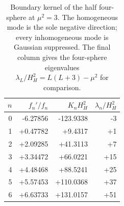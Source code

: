 \begin{table}[htbp]\centering\small
\begin{tabular}{r r r r}
\hline
$n$ & $f_n'/f_n$ & $K_n H_H^2$ & $\lambda_n/H_H^2$ \\
\hline
0 & -6.27856 & -123.9338 & -3 \\
1 & +0.47782 & +9.4317 & +1 \\
2 & +2.09285 & +41.3113 & +7 \\
3 & +3.34472 & +66.0221 & +15 \\
4 & +4.48468 & +88.5241 & +25 \\
5 & +5.57453 & +110.0368 & +37 \\
6 & +6.63733 & +131.0157 & +51 \\
\hline
\end{tabular}
\caption{Boundary kernel of the half four-sphere at $\mu^2=3$. The homogeneous mode is the sole negative direction; every inhomogeneous mode is Gaussian suppressed. The final column gives the four-sphere eigenvalues $\lambda_L/H_H^2=L(L+3)-\mu^2$ for comparison.}
\label{tab:kernel}
\end{table}
